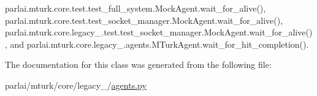 parlai.\+mturk.\+core.\+test.\+test\+\_\+full\+\_\+system.\+Mock\+Agent.\+wait\+\_\+for\+\_\+alive(), parlai.\+mturk.\+core.\+test.\+test\+\_\+socket\+\_\+manager.\+Mock\+Agent.\+wait\+\_\+for\+\_\+alive(), parlai.\+mturk.\+core.\+legacy\+\_.\+test.\+test\+\_\+socket\+\_\+manager.\+Mock\+Agent.\+wait\+\_\+for\+\_\+alive(), and parlai.\+mturk.\+core.\+legacy\+\_.\+agents.\+M\+Turk\+Agent.\+wait\+\_\+for\+\_\+hit\+\_\+completion().



The documentation for this class was generated from the following file\+:\begin{DoxyCompactItemize}
\item 
parlai/mturk/core/legacy\+\_/\hyperlink{parlai_2mturk_2core_2legacy__2018_2agents_8py}{agents.\+py}\end{DoxyCompactItemize}
